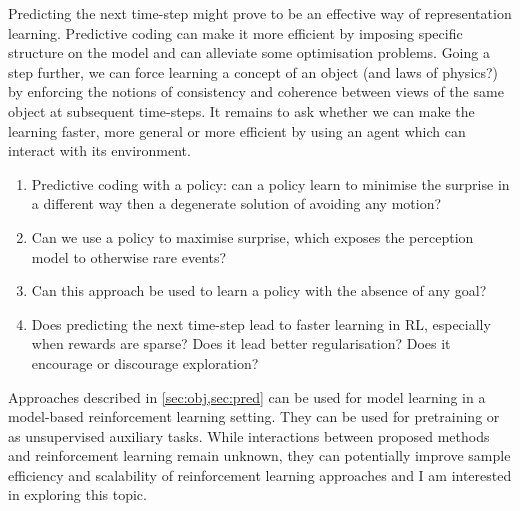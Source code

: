     Predicting the next time-step might prove to be an effective way of representation learning. Predictive coding can make it more efficient by imposing specific structure on the model and can alleviate some optimisation problems. Going a step further, we can force learning a concept of an object (and laws of physics?) by enforcing the notions of consistency and coherence between views of the same object at subsequent time-steps. It remains to ask whether we can make the learning faster, more general or more efficient by using an agent which can interact with its environment. 
    \begin{enumerate}
        \item Predictive coding with a policy: can a policy learn to minimise the surprise in a different way then a degenerate solution of avoiding any motion?
        \item Can we use a policy to maximise surprise, which exposes the perception model to otherwise rare events?
        \item Can this approach be used to learn a policy with the absence of any goal?
        \item Does predicting the next time-step lead to faster learning in RL, especially when rewards are sparse? Does it lead better regularisation? Does it encourage or discourage exploration?
    \end{enumerate} 
    Approaches described in \cref{sec:obj,sec:pred} can be used for model learning in a model-based reinforcement learning setting. They can be used for pretraining or as unsupervised auxiliary tasks. While interactions between proposed methods and reinforcement learning remain unknown, they can potentially improve sample efficiency and scalability of reinforcement learning approaches and I am interested in exploring this topic.

